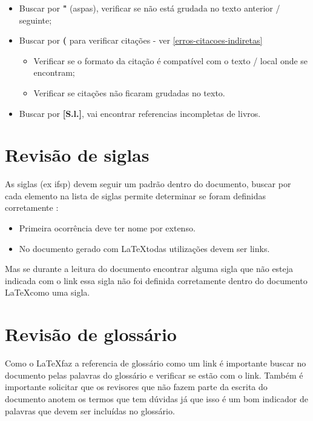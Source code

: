 \begin{itemize}
    \item Buscar por \textbf{"} (aspas), verificar se não está grudada no texto anterior / seguinte;
    
    \item Buscar por \textbf{(} para verificar citações - ver \autoref{erros-citacoes-indiretas}
        \begin{itemize}
            \item Verificar se o formato da citação é compatível com o texto / local onde se encontram;
            
            \item Verificar se citações não ficaram grudadas no texto.
        \end{itemize}
            
    \item Buscar por \textbf{[S.l.]}, vai encontrar referencias incompletas de livros.
\end{itemize}

\section{Revisão de siglas}
\label{buscas-siglas}

As siglas (ex \ac{ifsp}) devem seguir um padrão dentro do documento, buscar por cada elemento na lista de siglas permite determinar se foram definidas corretamente :

\begin{itemize}
    \item Primeira ocorrência deve ter nome por extenso.
    
    \item No documento gerado com \LaTeX \space todas utilizações devem ser links.
\end{itemize}

Mas se durante a leitura do documento encontrar alguma sigla que não esteja indicada com o link essa sigla não foi definida corretamente dentro do documento \LaTeX  \space como uma sigla.

\section{Revisão de glossário}
\label{buscas-glossario}

Como o \LaTeX \space faz a referencia de glossário como um link é importante buscar no documento pelas palavras do glossário e verificar se estão com o link. Também é importante solicitar que os revisores que não fazem parte da escrita do documento anotem os termos que tem dúvidas já que isso é um bom indicador de palavras que devem ser incluídas no glossário.


